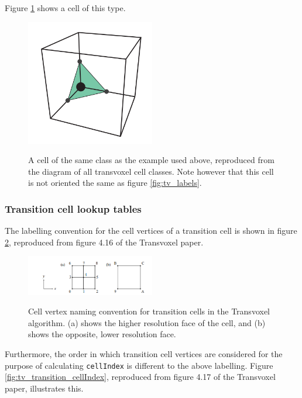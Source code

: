 \documentclass{article}
\begin{document}
Figure \ref{fig:regular_cell_example_case} shows a cell of this type.
\begin{figure}
  \caption{A cell of the same class as the example used above, reproduced from the diagram of all transvoxel cell classes\cite{lengyel}. Note however that this cell is not oriented the same as figure \ref{fig:tv_labels}.}
  \includegraphics[width=0.5\textwidth]{regular_cell_example_case.PNG}
  \label{fig:regular_cell_example_case}
\end{figure}

\subsubsection{Transition cell lookup tables}

The labelling convention for the cell vertices of a transition cell is shown in figure \ref{fig:tv_transition_labels}, reproduced from figure 4.16 of the Transvoxel paper\cite{lengyel_2010}.

\begin{figure}
  \caption{Cell vertex naming convention for transition cells in the Transvoxel algorithm. (a) shows the higher resolution face of the cell, and (b) shows the opposite, lower resolution face.}
  \includegraphics[width=0.5\textwidth]{tv_transition_labels.PNG}
  \label{fig:tv_transition_labels}
\end{figure}

Furthermore, the order in which transition cell vertices are considered for the purpose of calculating \texttt{cellIndex} is different to the above labelling. Figure \ref{fig:tv_transition_cellIndex}, reproduced from figure 4.17 of the Transvoxel paper\cite{lengyel_2010}, illustrates this.
\end{document}
